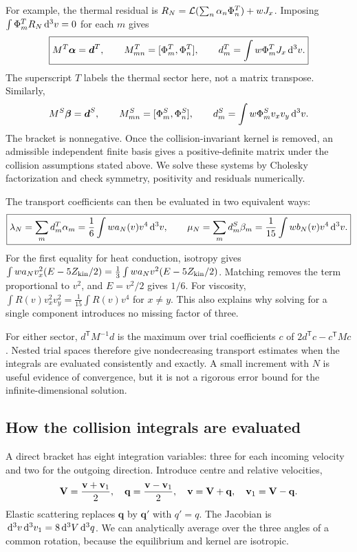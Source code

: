 For example, the thermal residual is
$R_N=\mathcal L(\sum_n\alpha_n\Phi_n^T)+wJ_x$.
Imposing $\int\Phi_m^TR_N\,\mathrm d^3v=0$ for each $m$ gives
\begin{equation}
 \boxed{M^T\boldsymbol\alpha=\boldsymbol d^T,\qquad
 M^T_{mn}=[\Phi_m^T,\Phi_n^T],\qquad
 d_m^T=\int w\Phi_m^TJ_x\,\mathrm d^3v.}
 \label{qt:galerkin}
\end{equation}
The superscript $T$ labels the thermal sector here, not a matrix transpose.
Similarly,
\begin{equation}
 M^S\boldsymbol\beta=\boldsymbol d^S,\qquad
 M^S_{mn}=[\Phi_m^S,\Phi_n^S],\qquad
 d_m^S=\int w\Phi_m^Sv_xv_y\,\mathrm d^3v.
\end{equation}
The bracket is nonnegative. Once the collision-invariant kernel is removed,
an admissible independent finite basis gives a positive-definite matrix under
the collision assumptions stated above. We solve these systems by Cholesky
factorization and check symmetry, positivity and residuals numerically.

The transport coefficients can then be evaluated in two equivalent ways:
\begin{equation}
 \boxed{\lambda_N=\sum_m d_m^T\alpha_m
 =\frac16\int wa_N(v)v^4\,\mathrm d^3v,\qquad
 \mu_N=\sum_m d_m^S\beta_m
 =\frac1{15}\int wb_N(v)v^4\,\mathrm d^3v.}
 \label{qt:coefficients}
\end{equation}
For the first equality for heat conduction, isotropy gives
$\int w a_Nv_x^2(E-5Z_{\mathrm{kin}}/2)=\frac13\int wa_Nv^2(E-5Z_{\mathrm{kin}}/2)$.
Matching removes the term proportional to $v^2$, and $E=v^2/2$ gives $1/6$.
For viscosity, $\int R(v)v_x^2v_y^2=\frac1{15}\int R(v)v^4$ for $x\ne y$.
This also explains why solving for a single component introduces no missing
factor of three.

For either sector, $d^{\mathsf T}M^{-1}d$ is the maximum over trial
coefficients $c$ of $2d^{\mathsf T}c-c^{\mathsf T}Mc$.
Nested trial spaces therefore give nondecreasing transport estimates when the
integrals are evaluated consistently and exactly. A small increment with $N$
is useful evidence of convergence, but it is not a rigorous error bound for
the infinite-dimensional solution.

\subsection{How the collision integrals are evaluated}
A direct bracket has eight integration variables: three for each incoming
velocity and two for the outgoing direction. Introduce centre and relative
velocities,
\begin{equation}
 \mathbf V=\frac{\mathbf v+\mathbf v_1}{2},\quad
 \mathbf q=\frac{\mathbf v-\mathbf v_1}{2},\quad
 \mathbf v=\mathbf V+\mathbf q,\quad \mathbf v_1=\mathbf V-\mathbf q.
\end{equation}
Elastic scattering replaces $\mathbf q$ by $\mathbf q'$ with $q'=q$.
The Jacobian is $\,\mathrm d^3v\,\mathrm d^3v_1=8\,\mathrm d^3V\,\mathrm d^3q$.
We can analytically average over the three angles of a common rotation,
because the equilibrium and kernel are isotropic.

